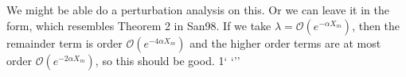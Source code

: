 \documentclass[12pt]{article}
\newtheorem{corollary}{Corollary}
\begin{document}
We might be able do a perturbation analysis on this. Or we can leave it in the form, which resembles Theorem 2 in San98. If we take $\lambda = \mathcal{O}(e^{-\alpha X_m})$, then the remainder term is order $\mathcal{O}(e^{-4\alpha X_m})$ and the higher order terms are at most order $\mathcal{O}(e^{-2 \alpha X_m})$, so this should be good. 1`	`''














\end{document}
